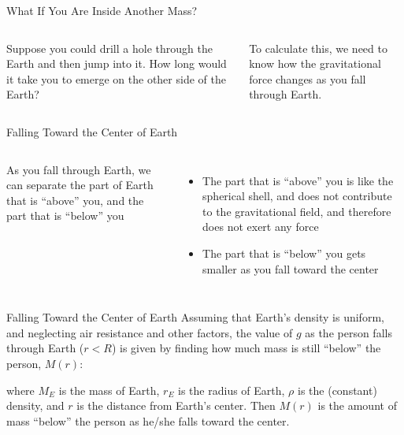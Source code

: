 \documentclass[12pt,compress,aspectratio=169]{beamer}
\begin{document}
\begin{frame}{What If You Are Inside Another Mass?}%
  \begin{columns}


    Suppose you could drill a hole through the Earth and then jump into it. How
    long would it take you to emerge on the other side of the Earth?

    \vspace{.2in}To calculate this, we need to know how the gravitational force
    changes as you fall through Earth.
  \end{columns}
\end{frame}




\begin{frame}{Falling Toward the Center of Earth}
  \begin{columns}

    As you fall through Earth, we can separate the part of Earth that is
    ``above'' you, and the part that is ``below'' you
    \begin{itemize}
    \item The part that is ``above'' you is like the spherical shell, and does
      not contribute to the gravitational field, and therefore does not exert
      any force
    \item The part that is ``below'' you gets smaller as you fall toward the
      center
    \end{itemize}
  \end{columns}
\end{frame}



\begin{frame}{Falling Toward the Center of Earth}
  Assuming that Earth's density is uniform, and neglecting air resistance and
  other factors, the value of $g$ as the person falls through Earth ($r<R$) is
  given by finding how much mass is still ``below'' the person, $M(r)$:


  where $M_E$ is the mass of Earth, $r_E$ is the radius of Earth,
  $\rho$ is the (constant) density, and $r$ is the distance from Earth's
  center. Then $M(r)$ is the amount of mass ``below'' the person as he/she
  falls toward the center.
\end{frame}
\end{document}
